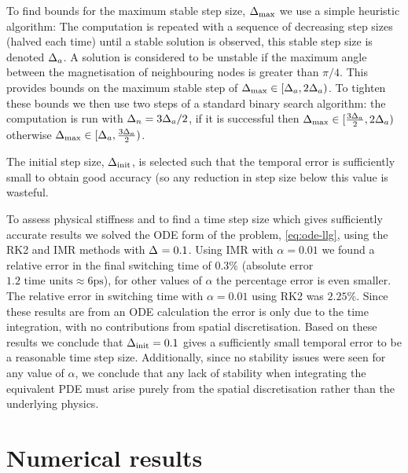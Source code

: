 To find bounds for the maximum stable step size, $\Delta_{\mathrm{max}}$ we use a simple heuristic algorithm:
The computation is repeated with a sequence of decreasing step sizes (halved each time) until a stable solution is observed, this stable step size is denoted $\Delta_{a}$.
A solution is considered to be unstable if the maximum angle between the magnetisation of neighbouring nodes is greater than $\pi/4$.
This provides bounds on the maximum stable step of $\Delta_{\mathrm{max}} \in [\Delta_{a}, 2\Delta_{a})$. To tighten these bounds we then use two steps of a standard binary search algorithm: the computation is run with $\Delta_{n}{} = 3\Delta_{a}/2$, if it is successful then $\Delta_{\mathrm{max}} \in [\frac{3\Delta_{a}}{2}, 2\Delta_{a})$ otherwise $\Delta_{\mathrm{max}} \in [\Delta_{a}, \frac{3\Delta_{a}}{2})$.

The initial step size, $\Delta_{\mathrm{init}}$, is selected such that the temporal error is sufficiently small to obtain good accuracy (so any reduction in step size below this value is wasteful.

To assess physical stiffness and to find a time step size which gives sufficiently accurate results we solved the ODE form of the problem, \cref{eq:ode-llg}, using the RK2 and IMR methods with $\Delta_{} = 0.1$.
Using IMR with $\alpha = 0.01$ we found a relative error in the final switching time of $0.3\%$ (absolute error  $1.2 \text{ time units} \approx 6\text{ps}$), for other values of $\alpha$ the percentage error is even smaller.
The relative error in switching time with $\alpha = 0.01$ using RK2 was $2.25\%$.
Since these results are from an ODE calculation the error is only due to the time integration, with no contributions from spatial discretisation.
Based on these results we conclude that $\Delta_{\mathrm{init}} = 0.1$ gives a sufficiently small temporal error to be a reasonable time step size.
Additionally, since no stability issues were seen for any value of $\alpha$, we conclude that any lack of stability when integrating the equivalent PDE must arise purely from the spatial discretisation rather than the underlying physics.


\section{Numerical results}


